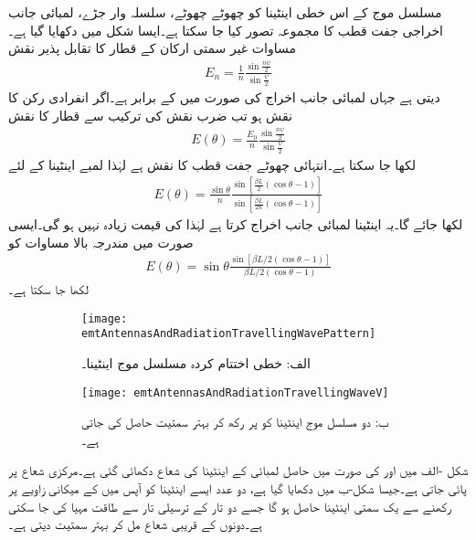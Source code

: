 مسلسل موج کے اس خطی اینٹینا کو چھوٹے چھوٹے، سلسلہ وار جڑے، لمبائی جانب اخراجی جفت قطب کا مجموعہ تصور کیا جا سکتا ہے۔ایسا شکل میں دکھایا گیا ہے۔مساوات  غیر سمتی ارکان کے قطار کا تقابل پذیر نقش 
\begin{align*}
E_n=\frac{1}{n}\frac{\sin \frac{n\psi}{2}}{\sin \frac{\psi}{2}}
\end{align*}
دیتی ہے جہاں لمبائی جانب اخراج کی صورت میں   کے برابر ہے۔اگر انفرادی رکن کا نقش  ہو تب  ضرب نقش کی ترکیب سے قطار کا نقش
\begin{align*}
E(\theta)=\frac{E_0}{n}\frac{\sin \frac{n\psi}{2}}{\sin \frac{\psi}{2}}
\end{align*}
لکھا جا سکتا ہے۔انتہائی چھوٹے جفت قطب کا نقش  ہے لہٰذا لمبے اینٹینا  کے لئے
\begin{align}
E(\theta)=\frac{\sin \theta}{n} \frac{\sin[\frac{\beta L}{2} (\cos \theta-1)]}{\sin [\frac{\beta L}{2n} (\cos \theta-1)]}
\end{align}
لکھا جائے گا۔یہ اینٹینا لمبائی جانب اخراج کرتا ہے لہٰذا  کی قیمت زیادہ نہیں ہو گی۔ایسی صورت میں مندرجہ بالا مساوات کو
\begin{align}\label{مساوات_اینٹینا_لمبی_مسلسل_موج_اینٹینا}
E(\theta)=\sin \theta\frac{\sin[\beta L\!/\!2 (\cos \theta-1)]}{\beta L\!/\!2 (\cos \theta-1)}
\end{align}
لکھا جا سکتا ہے۔

\begin{figure}
\centering
\begin{subfigure}{0.5\textwidth}
\centering
\texttt{[image: emtAntennasAndRadiationTravellingWavePattern]}
\caption*{الف: خطی اختتام کردہ مسلسل موج اینٹینا۔}
\end{subfigure}%
\begin{subfigure}{0.5\textwidth}
\centering
\texttt{[image: emtAntennasAndRadiationTravellingWaveV]}
\caption{ب: دو مسلسل موج اینٹینا کو  پر رکھ کر بہتر سمتیت حاصل کی جاتی ہے۔}
\end{subfigure}%
\caption{}
\label{شکل_اینٹینا_مسلسل_موج_شعاع}
\end{figure}

شکل -الف میں اور  کی صورت میں حاصل  لمبائی کے اینٹینا کی شعاع دکھائی گئی ہے۔مرکزی شعاع  پر پائی جاتی ہے۔جیسا شکل-ب میں دکھایا گیا ہے، دو عدد ایسے اینٹینا کو آپس میں  کے میکانی زاویے پر رکھنے سے یک سمتی اینٹینا حاصل ہو گا جسے  دو تار کے ترسیلی تار سے طاقت مہیا کی جا سکتی ہے۔دونوں کے قریبی شعاع مل کر بہتر سمتیت دیتی ہے۔

